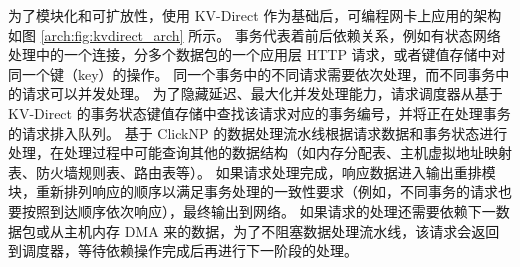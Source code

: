 为了模块化和可扩放性，使用 KV-Direct 作为基础后，可编程网卡上应用的架构如图 \ref{arch:fig:kvdirect_arch} 所示。
事务代表着前后依赖关系，例如有状态网络处理中的一个连接，分多个数据包的一个应用层 HTTP 请求，或者键值存储中对同一个键（key）的操作。
同一个事务中的不同请求需要依次处理，而不同事务中的请求可以并发处理。
为了隐藏延迟、最大化并发处理能力，请求调度器从基于 KV-Direct 的事务状态键值存储中查找该请求对应的事务编号，并将正在处理事务的请求排入队列。
基于 ClickNP 的数据处理流水线根据请求数据和事务状态进行处理，在处理过程中可能查询其他的数据结构（如内存分配表、主机虚拟地址映射表、防火墙规则表、路由表等）。
如果请求处理完成，响应数据进入输出重排模块，重新排列响应的顺序以满足事务处理的一致性要求（例如，不同事务的请求也要按照到达顺序依次响应），最终输出到网络。
如果请求的处理还需要依赖下一数据包或从主机内存 DMA 来的数据，为了不阻塞数据处理流水线，该请求会返回到调度器，等待依赖操作完成后再进行下一阶段的处理。

